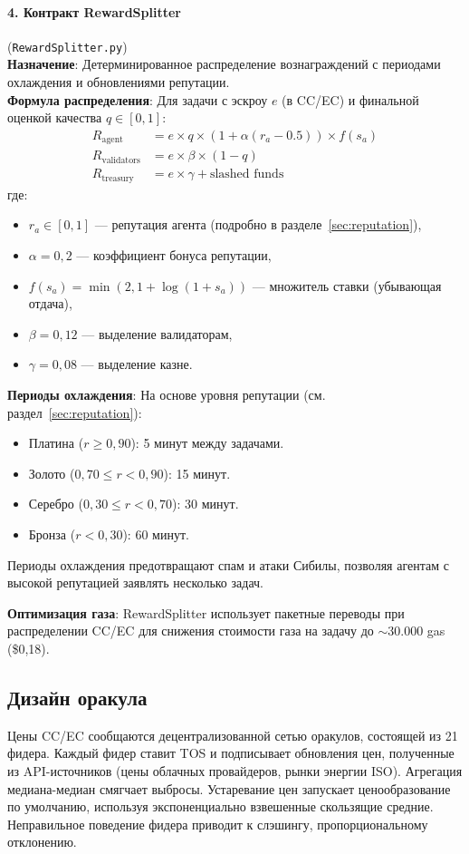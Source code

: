 \documentclass[11pt]{article}
\begin{document}
\paragraph{4. Контракт RewardSplitter} (\texttt{RewardSplitter.py})\\
\textbf{Назначение}: Детерминированное распределение вознаграждений с периодами охлаждения и обновлениями репутации.\\
\textbf{Формула распределения}: Для задачи с эскроу $e$ (в CC/EC) и финальной оценкой качества $q \in [0,1]$:
\begin{align}
R_{\text{agent}} &= e \times q \times \left(1 + \alpha (r_a - 0.5)\right) \times f(s_a) \label{eq:reward-agent} \\
R_{\text{validators}} &= e \times \beta \times (1-q) \label{eq:reward-validators} \\
R_{\text{treasury}} &= e \times \gamma + \text{slashed funds} \label{eq:reward-treasury}
\end{align}
где:
\begin{itemize}[noitemsep]
  \item $r_a \in [0,1]$ — репутация агента (подробно в разделе~\ref{sec:reputation}),
  \item $\alpha = 0,2$ — коэффициент бонуса репутации,
  \item $f(s_a) = \min(2, 1 + \log(1+s_a))$ — множитель ставки (убывающая отдача),
  \item $\beta = 0,12$ — выделение валидаторам,
  \item $\gamma = 0,08$ — выделение казне.
\end{itemize}
\textbf{Периоды охлаждения}: На основе уровня репутации (см. раздел~\ref{sec:reputation}):
\begin{itemize}[noitemsep]
  \item Платина ($r \geq 0,90$): 5 минут между задачами.
  \item Золото ($0,70 \leq r < 0,90$): 15 минут.
  \item Серебро ($0,30 \leq r < 0,70$): 30 минут.
  \item Бронза ($r < 0,30$): 60 минут.
\end{itemize}
Периоды охлаждения предотвращают спам и атаки Сибилы, позволяя агентам с высокой репутацией заявлять несколько задач.

\textbf{Оптимизация газа}: RewardSplitter использует пакетные переводы при распределении CC/EC для снижения стоимости газа на задачу до $\sim$30.000 gas (\$0,18).

\subsection{Дизайн оракула}
Цены CC/EC сообщаются децентрализованной сетью оракулов, состоящей из 21 фидера. Каждый фидер ставит TOS и подписывает обновления цен, полученные из API-источников (цены облачных провайдеров, рынки энергии ISO). Агрегация медиана-медиан смягчает выбросы. Устаревание цен запускает ценообразование по умолчанию, используя экспоненциально взвешенные скользящие средние. Неправильное поведение фидера приводит к слэшингу, пропорциональному отклонению.
\end{document}
